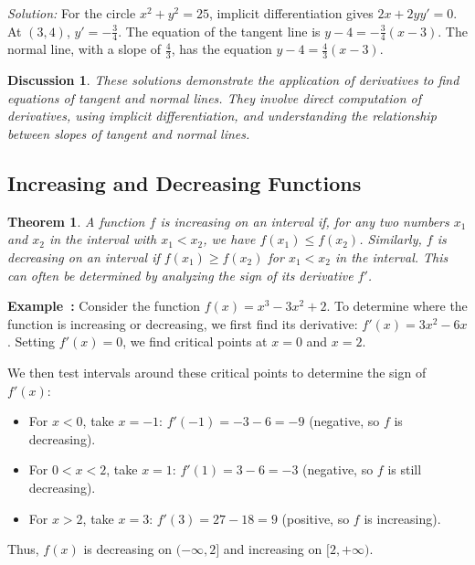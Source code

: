 \documentclass[a4paper,12pt]{book}
\newenvironment{solution}[1][]
{\par\noindent\textit{Solution:} \rmfamily}{\medskip}
\newcounter{example}
\newenvironment{example}[1][\theexample]
  {\refstepcounter{example}\par\medskip\noindent\textbf{Example~#1:} \rmfamily}
  {\medskip}
\newtheorem{theorem}{Theorem}
\newtheorem{discussion}{Discussion}
\begin{document}
\begin{solution}[to Problem 6]
For the circle \( x^2 + y^2 = 25 \), implicit differentiation gives \( 2x + 2yy' = 0 \). At \( (3, 4) \), \( y' = -\frac{3}{4} \). The equation of the tangent line is \( y - 4 = -\frac{3}{4}(x - 3) \). The normal line, with a slope of \( \frac{4}{3} \), has the equation \( y - 4 = \frac{4}{3}(x - 3) \).
\end{solution}

\begin{discussion}
These solutions demonstrate the application of derivatives to find equations of tangent and normal lines. They involve direct computation of derivatives, using implicit differentiation, and understanding the relationship between slopes of tangent and normal lines.
\end{discussion}

\subsection{Increasing and Decreasing Functions}
\begin{theorem}
A function \( f \) is increasing on an interval if, for any two numbers \( x_1 \) and \( x_2 \) in the interval with \( x_1 < x_2 \), we have \( f(x_1) \leq f(x_2) \). Similarly, \( f \) is decreasing on an interval if \( f(x_1) \geq f(x_2) \) for \( x_1 < x_2 \) in the interval. This can often be determined by analyzing the sign of its derivative \( f' \).
\end{theorem}

\begin{example}
Consider the function \( f(x) = x^3 - 3x^2 + 2 \). To determine where the function is increasing or decreasing, we first find its derivative: \( f'(x) = 3x^2 - 6x \). Setting \( f'(x) = 0 \), we find critical points at \( x = 0 \) and \( x = 2 \).

We then test intervals around these critical points to determine the sign of \( f'(x) \):
\begin{itemize}
    \item For \( x < 0 \), take \( x = -1 \): \( f'(-1) = -3 - 6 = -9 \) (negative, so \( f \) is decreasing).
    \item For \( 0 < x < 2 \), take \( x = 1 \): \( f'(1) = 3 - 6 = -3 \) (negative, so \( f \) is still decreasing).
    \item For \( x > 2 \), take \( x = 3 \): \( f'(3) = 27 - 18 = 9 \) (positive, so \( f \) is increasing).
\end{itemize}

Thus, \( f(x) \) is decreasing on \((- \infty, 2]\) and increasing on \([2, +\infty)\).
\end{example}
\end{document}

